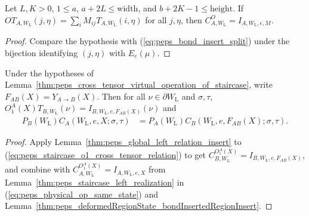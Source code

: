 \begin{lemma}%
    \label{thm:peps_global_left_relation_insert}
    \leanok
    Let $L,K>0$, $1\leq a$, $a+2L\leq\mathrm{width}$, and
    $b+2K-1\leq\mathrm{height}$. If
    $OT_{A,W_{\mathrm L}}(j,\eta)=\sum_i M_{ij}T_{A,W_{\mathrm L}}(i,\eta)$
    for all $j,\eta$, then $C^O_{A,W_{\mathrm L}}=I_{A,W_{\mathrm L},e,M}$.
\end{lemma}
\begin{proof}
    \leanok
    Compare the hypothesis with (\ref{eq:peps_bond_insert_split}) under the
    bijection identifying $(j,\eta)$ with $E_e(\mu)$.
\end{proof}

\begin{lemma}%
    \label{thm:peps_cross_tensor_realization_coefficients}
    \leanok
    Under the hypotheses of
    Lemma~\ref{thm:peps_cross_tensor_virtual_operation_of_staircase},
    write $F_{AB}(X)=Y_{A\to B}(X)$. Then for all $\nu\in\partial W_{\mathrm L}$
    and $\sigma,\tau$,
    $O_1^A(X)T_{B,W_{\mathrm L}}(\nu)=I_{B,W_{\mathrm L},e,F_{AB}(X)}(\nu)$ and
    \begin{align}
        P_B(W_{\mathrm L})C_A(W_{\mathrm L},e,X;\sigma,\tau)
         & =P_A(W_{\mathrm L})C_B(W_{\mathrm L},e,F_{AB}(X);\sigma,\tau).
        \label{eq:peps_cross_tensor_normalized_coefficients}
    \end{align}
\end{lemma}
\begin{proof}
    \leanok
    Apply Lemma~\ref{thm:peps_global_left_relation_insert} to
    (\ref{eq:peps_staircase_o1_cross_tensor_relation}) to get
    $C^{O_1^A(X)}_{B,W_{\mathrm L}}=I_{B,W_{\mathrm L},e,F_{AB}(X)}$, and combine
    with $C^{O_1^A(X)}_{A,W_{\mathrm L}}=I_{A,W_{\mathrm L},e,X}$ from
    Lemma~\ref{thm:peps_staircase_left_realization} in
    (\ref{eq:peps_physical_op_same_state}) and
    Lemma~\ref{thm:peps_deformedRegionState_bondInsertedRegionInsert}.
\end{proof}

